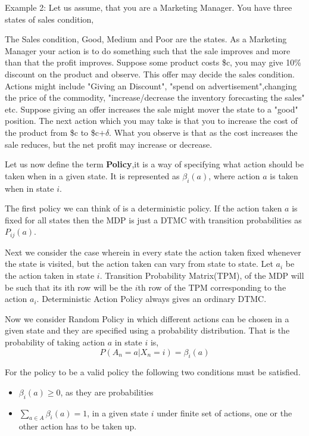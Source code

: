 Example 2: Let us assume, that you are a Marketing Manager. You have three states of sales condition,
\begin{center}
\end{center}
The Sales condition, Good, Medium and Poor are the states. As a Marketing Manager your action is to do something such that the sale improves and more than that the profit improves. Suppose some product costs \$c, you may give 10\% discount on the product and observe.  This offer may decide the sales condition. Actions might include "Giving an Discount", "spend on advertisement",changing the price of the commodity, "increase/decrease the inventory forecasting the sales" etc. Suppose giving an offer increases the sale might mover the state to a "good" position. The next action which you may take is that you to increase the cost of the product from \$c to \$c$+\delta$. What you observe is that as the cost increases the sale reduces, but the net profit may increase or decrease. 

Let us now define the term \textbf{Policy},it is a way of specifying what action should be taken when in a given state. It is represented as $\beta_i(a)$, where action $a$ is taken when in state $i$. 

The first policy we can think of is  a deterministic policy. If the action taken $a$ is fixed for all states then the MDP is just a DTMC with transition probabilities as $P_{ij}(a)$. 

Next we consider the case wherein in every state the action taken fixed whenever the state is visited, but the action taken can vary from state to state. Let $a_{i}$  be the action taken in state $i$. Transition Probability Matrix(TPM), of the MDP will be such that its ith row will  be the $i$th row of the TPM corresponding to the action $a_{i}$.
Deterministic Action Policy always gives an ordinary DTMC. 

Now we consider  Random Policy in which different actions can be chosen in a given state  and they are specified using a probability distribution. That is the probability of taking action $a$ in state $i$ is,
\begin{equation*}
    P(A_n=a|X_n=i)=\beta_i(a)
\end{equation*}

For the policy to be a valid policy the following two conditions must be satisfied.
\begin{itemize}
    \item $\beta_i(a) \geq 0$, as they are probabilities
    \item $\sum_{a\in A}\beta_i(a)=1$, in a given state $i$ under finite set of actions, one or the other action has to be taken up. 
\end{itemize}

